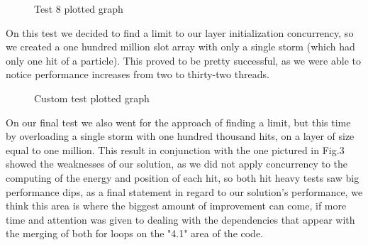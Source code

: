 \documentclass[10pt,journal,compsoc]{IEEEtran}
\begin{document}
\begin{center} \label{fig4}
    \begin{figure}[htbp]
        \caption{Test 8 plotted graph}
        \centering{\label{fig}}
    \end{figure}
\end{center}

On this test we decided to find a limit to our layer initialization concurrency, so we created a one hundred million slot array with only a single storm (which had only one hit of a particle). This proved to be pretty successful, as we were able to notice performance increases from two to thirty-two threads.

\begin{center} \label{fig5}
    \begin{figure}[htbp]
        \caption{Custom test plotted graph}
        \centering{\label{fig}}
    \end{figure}
\end{center}

On our final test we also went for the approach of finding a limit, but this time by overloading a single storm with one hundred thousand hits, on a layer of size equal to one million. This result in conjunction with the one pictured in Fig.3 showed the weaknesses of our solution, as we did not apply concurrency to the computing of the energy and position of each hit, so both hit heavy tests saw big performance dips, as a final statement in regard to our solution's performance, we think this area is where the biggest amount of improvement can come, if more time and attention was given to dealing with the dependencies that appear with the merging of both for loops on the "4.1" area of the code.
\end{document}
